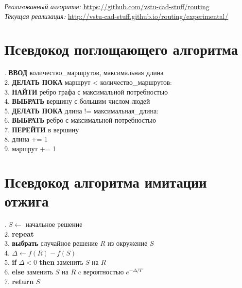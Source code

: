 \noindent
\emph{Реализованный алгоритм:} \url{https://github.com/vstu-cad-stuff/routing}\\
\emph{Текущая реализация:} \url{http://vstu-cad-stuff.github.io/routing/experimental/}\\

\newpage

\section{Псевдокод поглощающего алгоритма}\label{ref:greedy}
. \textbf{ВВОД} количество\_маршрутов, максимальная длина\\
2. \textbf{ДЕЛАТЬ ПОКА} маршрут < количество\_маршрутов:\\
3. \hspace*{0.5cm}\textbf{НАЙТИ} ребро графа с максимальной потребностью\\
4. \hspace*{0.5cm}\textbf{ВЫБРАТЬ} вершину с большим числом людей\\
5. \hspace*{0.5cm}\textbf{ДЕЛАТЬ ПОКА} длина != максимальная\_длина:\\
6. \hspace*{1.0cm}\textbf{ВЫБРАТЬ} ребро с максимальной потребностью\\
7. \hspace*{1.0cm}\textbf{ПЕРЕЙТИ} в вершину\\
8. \hspace*{1.0cm}длина += 1\\
9. \hspace*{0.5cm}маршрут += 1\\

\section{Псевдокод алгоритма имитации отжига}\label{ref:annealing}
. \( S \leftarrow \) начальное решение\\
2. \textbf{repeat}\\
3. \hspace*{2em} \textbf{выбрать} случайное решение \( R \) из окружение \( S \)\\
4. \hspace*{2em} \( \Delta \leftarrow f(R) - f(S) \)\\
5. \hspace*{2em} \textbf{if} \( \Delta < 0 \) \textbf{then} заменить \( S \) на \( R \)\\
6. \hspace*{2em} \textbf{else} заменить \( S \) на \( R \) c вероятностью \( e^{-\Delta/T} \)\\
7. \textbf{return} \( S \)

